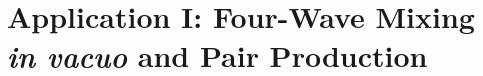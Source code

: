 \documentclass[11pt,SymmetricalJury]{inrsthesis/inrsthesis}
\begin{document}

\chapter{Application I: Four-Wave Mixing \textit{in vacuo} and Pair Production}
\label{chapter:fwm}
\end{document}

